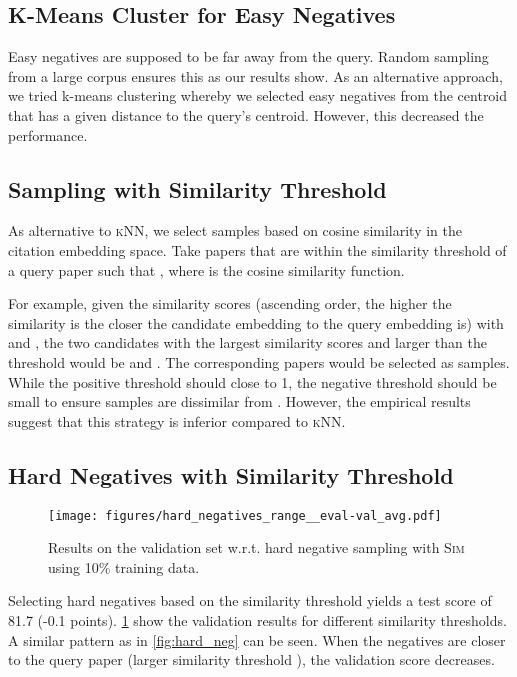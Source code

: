 \documentclass[11pt]{article}
\newcommand{\knn}{\textsc{kNN}\xspace}
\newcommand{\simthreshold}{\textsc{Sim}\xspace}
\begin{document}
\subsection{K-Means Cluster for Easy Negatives} 
Easy negatives are supposed to be far away from the query.
Random sampling from a large corpus ensures this as our results show.
As an alternative approach, we tried k-means clustering whereby we selected easy negatives from the centroid that has a given distance to the query's centroid.
However, this decreased the performance.

\subsection{Sampling with Similarity Threshold}

As alternative to \knn, we select samples based on cosine similarity in the citation embedding space.
 Take  papers that are within the similarity threshold  of a query paper  such that
 , where  is the cosine similarity function.

 For example, given the similarity scores  (ascending order, the higher the similarity is the closer the candidate embedding to the query embedding is) with  and , the two candidates with the largest similarity scores and larger than the threshold would be  and . 
 The corresponding papers would be selected as samples.
 While the positive threshold  should close to 1, the negative threshold  should be small  
 to ensure samples are dissimilar from .
However, the empirical results suggest that this strategy is inferior compared to \knn.

\subsection{Hard Negatives with Similarity Threshold}

\begin{figure}[ht]
\centering
\texttt{[image: figures/hard\_negatives\_range\_\_eval-val\_avg.pdf]}

\caption{\label{fig:hard_neg_range}Results on the validation set w.r.t. hard negative sampling with \simthreshold using 10\% training data.}
\end{figure}

Selecting hard negatives based on the similarity threshold yields a test score of  81.7 (-0.1 points).
\cref{fig:hard_neg_range} show the validation results for different similarity thresholds. 
A similar pattern as in \cref{fig:hard_neg} can be seen. 
When the negatives are closer to the query paper (larger similarity threshold ), the validation score decreases.
\end{document}
